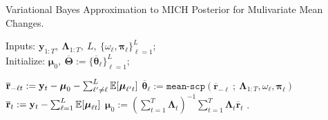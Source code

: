 \begin{algorithm}
\label{alg:mich-multi}
\caption{Variational Bayes Approximation to MICH Posterior for Mulivariate Mean Changes.}

\footnotesize
\SetAlgoLined
  Inputs: $\mathbf{y}_{1:T},\:\boldsymbol{\Lambda}_{1:T},\:L,\:\{\omega_\ell,\boldsymbol{\pi}_\ell\}_{\ell=1}^L;$ \\
  Initialize: $\boldsymbol{\mu}_0,\:\overline{\boldsymbol{\Theta}} := \{\overline{\boldsymbol{\theta}}_\ell\}_{\ell=1}^L$;
  
   {
     {
      $\overline{\mathbf{r}}_{-\ell t} := \mathbf{y}_t -\boldsymbol{\mu}_0 - \sum_{\ell' \neq \ell}^L \mathbb{E}[\boldsymbol{\mu}_{\ell' t}]$ 
      $\overline{\boldsymbol{\theta}}_\ell := \texttt{mean-scp}(\overline{\mathbf{r}}_{-\ell} \:;\: \boldsymbol{\Lambda}_{1:T}, \omega_{\ell}, \boldsymbol{\boldsymbol{\pi}}_{\ell})$ 
    }
    $\overline{\mathbf{r}}_{t} := \mathbf{y}_t- \sum_{\ell=1}^L \mathbb{E}[\boldsymbol{\mu}_{\ell t}]$ 
    $\boldsymbol{\mu}_0 :=\left(\sum_{t=1}^T\boldsymbol{\Lambda}_t\right)^{-1}\sum_{t=1}^T\boldsymbol{\Lambda}_t\overline{\mathbf{r}}_t $
  }
  .
\end{algorithm}
